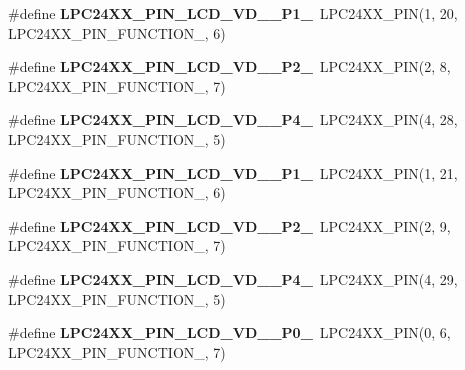 \begin{DoxyCompactItemize}
\item 
\mbox{\label{group__lpc24xx__io_ga963b4a90b8f9581349e8953b42e62509}} 
\#define {\bfseries L\+P\+C24\+X\+X\+\_\+\+P\+I\+N\+\_\+\+L\+C\+D\+\_\+\+V\+D\+\_\+\_\+\+P1\+\_}~L\+P\+C24\+X\+X\+\_\+\+P\+IN(1, 20, L\+P\+C24\+X\+X\+\_\+\+P\+I\+N\+\_\+\+F\+U\+N\+C\+T\+I\+O\+N\+\_, 6)
\item 
\mbox{\label{group__lpc24xx__io_gab13594dfe312e1d99b16fa5f1844f160}} 
\#define {\bfseries L\+P\+C24\+X\+X\+\_\+\+P\+I\+N\+\_\+\+L\+C\+D\+\_\+\+V\+D\+\_\+\_\+\+P2\+\_}~L\+P\+C24\+X\+X\+\_\+\+P\+IN(2, 8, L\+P\+C24\+X\+X\+\_\+\+P\+I\+N\+\_\+\+F\+U\+N\+C\+T\+I\+O\+N\+\_, 7)
\item 
\mbox{\label{group__lpc24xx__io_ga774ddd7c7d296413ce623fb5fb4e1231}} 
\#define {\bfseries L\+P\+C24\+X\+X\+\_\+\+P\+I\+N\+\_\+\+L\+C\+D\+\_\+\+V\+D\+\_\+\_\+\+P4\+\_}~L\+P\+C24\+X\+X\+\_\+\+P\+IN(4, 28, L\+P\+C24\+X\+X\+\_\+\+P\+I\+N\+\_\+\+F\+U\+N\+C\+T\+I\+O\+N\+\_, 5)
\item 
\mbox{\label{group__lpc24xx__io_ga75b15e25c69211233f80ee087b9ee353}} 
\#define {\bfseries L\+P\+C24\+X\+X\+\_\+\+P\+I\+N\+\_\+\+L\+C\+D\+\_\+\+V\+D\+\_\+\_\+\+P1\+\_}~L\+P\+C24\+X\+X\+\_\+\+P\+IN(1, 21, L\+P\+C24\+X\+X\+\_\+\+P\+I\+N\+\_\+\+F\+U\+N\+C\+T\+I\+O\+N\+\_, 6)
\item 
\mbox{\label{group__lpc24xx__io_ga9287bfbdbe8e992a2e0b3f6d4235aea5}} 
\#define {\bfseries L\+P\+C24\+X\+X\+\_\+\+P\+I\+N\+\_\+\+L\+C\+D\+\_\+\+V\+D\+\_\+\_\+\+P2\+\_}~L\+P\+C24\+X\+X\+\_\+\+P\+IN(2, 9, L\+P\+C24\+X\+X\+\_\+\+P\+I\+N\+\_\+\+F\+U\+N\+C\+T\+I\+O\+N\+\_, 7)
\item 
\mbox{\label{group__lpc24xx__io_ga0f05c45b8c619712b683ae231ca1b08c}} 
\#define {\bfseries L\+P\+C24\+X\+X\+\_\+\+P\+I\+N\+\_\+\+L\+C\+D\+\_\+\+V\+D\+\_\+\_\+\+P4\+\_}~L\+P\+C24\+X\+X\+\_\+\+P\+IN(4, 29, L\+P\+C24\+X\+X\+\_\+\+P\+I\+N\+\_\+\+F\+U\+N\+C\+T\+I\+O\+N\+\_, 5)
\item 
\mbox{\label{group__lpc24xx__io_ga47867dae4cba035ac5e4de55e2cd8ef0}} 
\#define {\bfseries L\+P\+C24\+X\+X\+\_\+\+P\+I\+N\+\_\+\+L\+C\+D\+\_\+\+V\+D\+\_\+\_\+\+P0\+\_}~L\+P\+C24\+X\+X\+\_\+\+P\+IN(0, 6, L\+P\+C24\+X\+X\+\_\+\+P\+I\+N\+\_\+\+F\+U\+N\+C\+T\+I\+O\+N\+\_, 7)

\end{DoxyCompactItemize}
